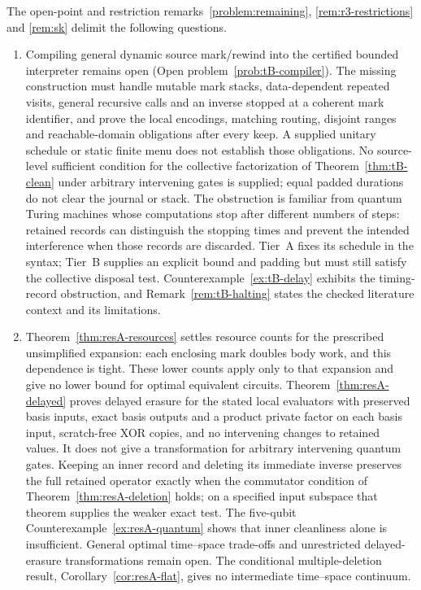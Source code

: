 The open-point and restriction remarks~\ref{problem:remaining}, \ref{rem:r3-restrictions} and \ref{rem:sk} delimit the following questions.
\begin{enumerate}
\item Compiling general dynamic source mark/rewind into the certified bounded interpreter remains open (Open problem~\ref{prob:tB-compiler}). The missing construction must handle mutable mark stacks, data-dependent repeated visits, general recursive calls and an inverse stopped at a coherent mark identifier, and prove the local encodings, matching routing, disjoint ranges and reachable-domain obligations after every keep. A supplied unitary schedule or static finite menu does not establish those obligations. No source-level sufficient condition for the collective factorization of Theorem~\ref{thm:tB-clean} under arbitrary intervening gates is supplied; equal padded durations do not clear the journal or stack. The obstruction
is familiar from quantum Turing machines whose computations stop after
different numbers of steps: retained records can distinguish the stopping
times and prevent the intended interference when those records are
discarded. Tier~A fixes its schedule in the syntax; Tier~B supplies an
explicit bound and padding but must still satisfy the collective disposal
test. Counterexample~\ref{ex:tB-delay} exhibits the timing-record
obstruction, and Remark~\ref{rem:tB-halting} states the checked literature
context and its limitations.
\item Theorem~\ref{thm:resA-resources} settles resource counts for the prescribed unsimplified expansion: each enclosing mark doubles body work, and this dependence is tight. These lower counts apply only to that expansion and give no lower bound for optimal equivalent circuits. Theorem~\ref{thm:resA-delayed} proves delayed erasure for the stated local evaluators with preserved basis inputs, exact basis outputs and a product private factor on each basis input, scratch-free XOR copies, and no intervening changes to retained values. It does not give a transformation for arbitrary intervening quantum gates. Keeping an inner record and deleting its immediate inverse preserves the full retained operator exactly when the commutator condition of Theorem~\ref{thm:resA-deletion} holds; on a specified input subspace that theorem supplies the weaker exact test. The five-qubit Counterexample~\ref{ex:resA-quantum} shows that inner cleanliness alone is insufficient. General optimal time--space trade-offs and unrestricted delayed-erasure transformations remain open. The conditional multiple-deletion result, Corollary~\ref{cor:resA-flat}, gives no intermediate time--space continuum.

\end{enumerate}
